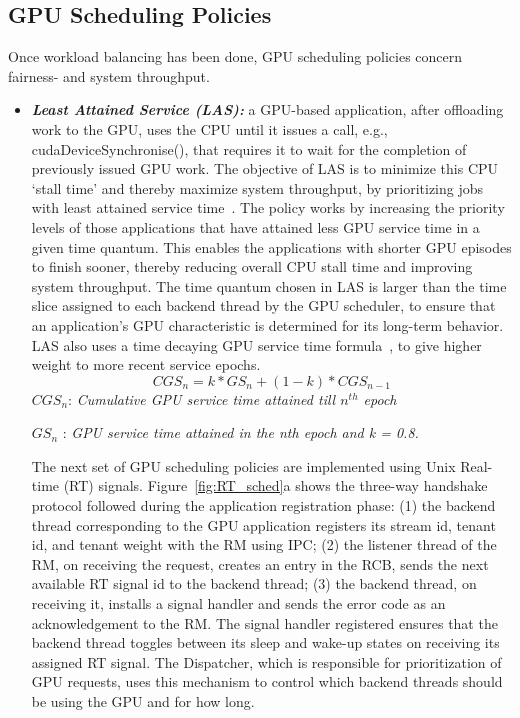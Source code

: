 \subsection{GPU Scheduling Policies}
Once workload balancing has been done, GPU scheduling policies concern fairness- and system throughput.
\begin{itemize}
\item \textbf{\textit{Least Attained Service (LAS): }} a GPU-based application, after offloading work to the GPU, uses the CPU until it issues a call, e.g., cudaDeviceSynchronise(), that requires it to wait for the completion of previously issued GPU work. The objective of LAS is to minimize this CPU `stall time' and thereby maximize system throughput, by prioritizing jobs with least attained service time~\cite{queue}. The policy works by increasing the priority levels of those applications that have attained less GPU service time in a given time quantum. This enables the applications with shorter GPU episodes to finish sooner, thereby reducing overall CPU stall time and improving system throughput. The time quantum chosen in LAS is larger than the time slice assigned to each backend thread by the GPU scheduler, to ensure that an application's GPU characteristic is determined for its long-term behavior. LAS also uses a time decaying GPU service time formula~\cite{atlas}, to give higher weight to more recent service epochs.
\begin{equation}
             CGS_n = k*GS_n + (1-k)*CGS_{n-1} 
\end{equation}
$CGS_n$: \textit{Cumulative GPU service time attained till $n^{th}$ epoch}

$GS_n$ : \textit{GPU service time attained in the nth epoch and k = 0.8.}

\hfill \break
The next set of GPU scheduling policies are implemented using Unix Real-time (RT) signals. Figure~\ref{fig:RT_sched}a shows the three-way handshake protocol followed during the application registration phase: (1) the backend thread corresponding to the GPU application registers its stream id, tenant id, and tenant weight with the RM using IPC; (2) the listener thread of the RM, on receiving the request, creates an entry in the RCB, sends the next available RT signal id to the backend thread; (3) the backend thread, on receiving it, installs a signal handler and sends the error code as an acknowledgement to the RM. The signal handler registered ensures that the backend thread toggles between its sleep and wake-up states on receiving its assigned RT signal. The Dispatcher, which is responsible for prioritization of GPU requests, uses this mechanism to control which backend threads should be using the GPU and for how long. 


\end{itemize}
